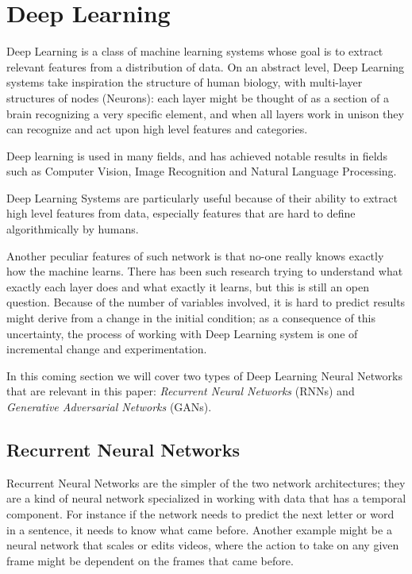 \section{Deep Learning}

Deep Learning is a class of machine learning systems whose goal is to extract relevant features from a distribution of data. On an abstract level, Deep Learning systems take inspiration the structure of human biology, with multi-layer structures of nodes (Neurons): each layer might be thought of as a section of a brain recognizing a very specific element, and when all layers work in unison they can recognize and act upon high level features and categories.

Deep learning is used in many fields, and has achieved notable results in fields such as Computer Vision, Image Recognition and Natural Language Processing.

Deep Learning Systems are particularly useful because of their ability to extract high level features from data, especially features that are hard to define algorithmically by humans.

Another peculiar features of such network is that no-one really knows exactly how the machine learns. There has been such research trying to understand what exactly each layer does and what exactly it learns, but this is still an open question.\newline %
Because of the number of variables involved, it is hard to predict results might derive from a change in the initial condition; as a consequence of this uncertainty, the process of working with Deep Learning system is one of incremental change and experimentation. 

In this coming section we will cover two types of Deep Learning Neural Networks that are relevant in this paper: \emph{Recurrent Neural Networks} (RNNs) and  \emph{Generative Adversarial Networks} (GANs).

\subsection{Recurrent Neural Networks}
Recurrent Neural Networks are the simpler of the two network architectures; they are a kind of neural network specialized in working with data that has a temporal component.
For instance if the network needs to predict the next letter or word in a sentence, it needs to know what came before. Another example might be a neural network that scales or edits videos, where the action to take on any given frame might be dependent on the frames that came before.

